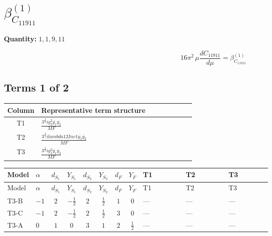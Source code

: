 \documentclass[8pt]{article}
\begin{document}
\begin{landscape}
\begin{longtable}{@{}llcccccc >{\raggedright\arraybackslash}p{0.21\linewidth} >{\raggedright\arraybackslash}p{0.21\linewidth} >{\raggedright\arraybackslash}p{0.21\linewidth}@{}}
\midrule
\bottomrule
\end{longtable}
\clearpage
\section*{$\beta_{C_{11911}}^{(1)}$}
\noindent\textbf{Quantity: }$\mathrm{1,1,9,11}$\par\smallskip
\[16\pi^2\,\mu\frac{d C_{11911}}{d\mu}=\beta_{C_{11911}}^{(1)}\]
\subsection*{Terms 1 of 2}
\begin{center}
\begin{tabular}{@{}c >{\raggedright\arraybackslash}p{0.82\linewidth}@{}}
\toprule
Column & Representative term structure \\
\midrule
T1 & \(\displaystyle \frac{3^{\frac{3}{4}} i g_{2}^{2} \overline{y_{1}} \overline{y_{2}}}{MF}\) \\
\midrule
T2 & \(\displaystyle \frac{3^{\frac{3}{4}} i lambda12Inv1 \overline{y_{1}} \overline{y_{2}}}{MF}\) \\
\midrule
T3 & \(\displaystyle \frac{3^{\frac{3}{4}} i g_{1}^{2} \overline{y_{1}} \overline{y_{2}}}{MF}\) \\
\midrule
\bottomrule
\end{tabular}
\end{center}
\smallskip
\tiny
\begin{longtable}{@{}llcccccc >{\raggedright\arraybackslash}p{0.21\linewidth} >{\raggedright\arraybackslash}p{0.21\linewidth} >{\raggedright\arraybackslash}p{0.21\linewidth}@{}}
\toprule
Model & $\alpha$ & $d_{S_1}$ & $Y_{S_1}$ & $d_{S_2}$ & $Y_{S_2}$ & $d_F$ & $Y_F$ & T1 & T2 & T3 \\
\midrule
\endfirsthead
\toprule
Model & $\alpha$ & $d_{S_1}$ & $Y_{S_1}$ & $d_{S_2}$ & $Y_{S_2}$ & $d_F$ & $Y_F$ & T1 & T2 & T3 \\
\midrule
\endhead
T3-B & $-1$ & $2$ & $-\frac{1}{2}$ & $2$ & $\frac{1}{2}$ & $1$ & $0$ & --- & --- & --- \\
\midrule
T3-C & $-1$ & $2$ & $-\frac{1}{2}$ & $2$ & $\frac{1}{2}$ & $3$ & $0$ & --- & --- & --- \\
\midrule
T3-A & $0$ & $1$ & $0$ & $3$ & $1$ & $2$ & $\frac{1}{2}$ & --- & --- & --- \\
\midrule

\end{longtable}
\end{landscape}
\end{document}
